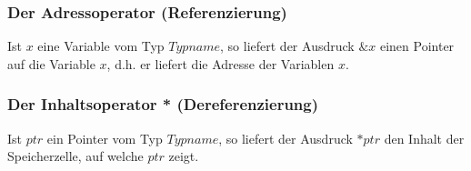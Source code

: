 	\begin{minipage}[t]{9 cm}
		\subsubsection{Der Adressoperator (Referenzierung) }	
			Ist $x$ eine Variable vom Typ $Typname$, so liefert der	Ausdruck $\&x$ einen Pointer auf die Variable $x$, d.h. er liefert die Adresse der Variablen $x$.	
			
	\end{minipage}
	\hspace*{0.5cm}
	\begin{minipage}[t]{9 cm}
		\subsubsection{Der Inhaltsoperator * (Dereferenzierung) }
			Ist $ptr$ ein Pointer vom Typ $Typname$, so liefert der	Ausdruck $*ptr$ den Inhalt der Speicherzelle, auf welche $ptr$ zeigt.
			\vspace*{-0.2cm}
	\end{minipage}	
	
